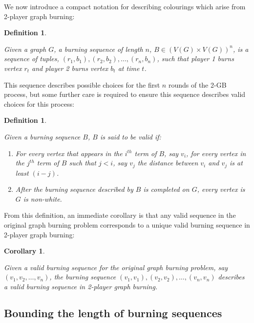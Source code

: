 \documentclass{mpaper}
\newtheorem{definition}[theorem]{Definition}
\newtheorem{corollary}[theorem]{Corollary}
\begin{document}
We now introduce a compact notation for describing colourings which arise from 2-player graph burning:

\begin{definition}
\label{def/burning-sequence}

Given a graph $G$, a \emph{burning sequence} of length $n$, $B \in (V(G) \times V(G))^n$, is a sequence of tuples, $(r_1, b_1), (r_2, b_2), \dots, (r_n, b_n)$, such that player 1 burns vertex $r_t$ and player 2 burns vertex $b_t$ at time $t$.
\end{definition}

This sequence describes possible choices for the first $n$ rounds of the 2-GB process, but some further care is required to ensure this sequence describes valid choices for this process:

\begin{definition}
\label{def/valid-burning}

Given a burning sequence $B$, $B$ is said to be \emph{valid} if:

\begin{enumerate}
  \item For every vertex that appears in the $i^{th}$ term of $B$, say $v_i$, for every vertex in the $j^{th}$ term of $B$ such that $j < i$, say $v_j$ the distance between $v_i$ and $v_j$ is at least $(i-j)$.
  \item After the burning sequence described by $B$ is completed on $G$, every vertex is $G$ is non-white. 
\end{enumerate}

\end{definition}

From this definition, an immediate corollary is that any valid sequence in the original graph burning problem corresponds to a unique valid burning sequence in 2-player graph burning:

\begin{corollary}
\label{cor/burning-subset}

Given a valid burning sequence for the original graph burning problem, say $(v_1, v_2, \dots, v_n)$, the burning sequence $(v_1, v_1), (v_2, v_2), \dots, (v_n, v_n)$ describes a valid burning sequence in 2-player graph burning.

\end{corollary}

\subsection{Bounding the length of burning sequences}
\vspace{1em}
\end{document}
